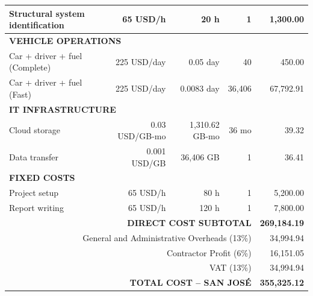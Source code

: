 \begin{longtable}{lrrrr}
Structural system identification & 65 USD/h & 20 h & 1 & 1,300.00 \\
\hline

\multicolumn{5}{l}{\textbf{VEHICLE OPERATIONS}} \\

Car + driver + fuel (Complete) & 225 USD/day & 0.05 day & 40 & 450.00 \\
Car + driver + fuel (Fast) & 225 USD/day & 0.0083 day & 36,406 & 67,792.91 \\
\hline

\multicolumn{5}{l}{\textbf{IT INFRASTRUCTURE}} \\

Cloud storage & 0.03 USD/GB-mo & 1,310.62 GB-mo & 36 mo & 39.32 \\

Data transfer & 0.001 USD/GB & 36,406 GB & 1 & 36.41 \\
\hline

\multicolumn{5}{l}{\textbf{FIXED COSTS}} \\

Project setup & 65 USD/h & 80 h & 1 & 5,200.00 \\
Report writing & 65 USD/h & 120 h & 1 & 7,800.00 \\
\hline

\multicolumn{4}{r}{\textbf{DIRECT COST SUBTOTAL}} & \textbf{269,184.19} \\
\hline

\multicolumn{4}{r}{General and Administrative Overheads (13\%)} & 34,994.94 \\
\multicolumn{4}{r}{Contractor Profit (6\%)} & 16,151.05 \\
\multicolumn{4}{r}{VAT (13\%)} & 34,994.94 \\
\hline

\multicolumn{4}{r}{\textbf{TOTAL COST – SAN JOSÉ}} & \textbf{355,325.12} \\
\hline

\end{longtable}
















